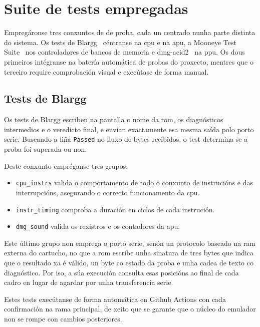 \section{Suite de tests empregadas}
\label{sec:suite_tests}

Empregáronse tres conxuntos de  de proba, cada un centrado nunha parte distinta do sistema.
Os tests de Blargg~\cite{blargg} céntranse na \acrshort{cpu} e na \acrshort{apu},
a Mooneye Test Suite~\cite{mooneyetestsuite} nos controladores de bancos de memoria
e dmg-acid2~\cite{dmgacid2} na \acrshort{ppu}.
Os dous primeiros intégranse na batería automática de probas do proxecto,
mentres que o terceiro require comprobación visual e execútase de forma manual.


\subsection{Tests de Blargg}

Os tests de Blargg escriben na pantalla o nome da \acrshort{rom}, os diagnósticos intermedios e o veredicto final,
e envían exactamente esa mesma saída polo porto serie. Buscando a liña \texttt{Passed} no fluxo de bytes recibidos, o test determina se a proba foi superada ou non.

Deste conxunto empréganse tres grupos:
\begin{itemize}
    \item \texttt{cpu\_instrs} valida o comportamento de todo o conxunto de instrucións e das interrupcións, asegurando o correcto funcionamento da \acrshort{cpu}.
    \item \texttt{instr\_timing} comproba a duración en ciclos de cada instrución.
    \item \texttt{dmg\_sound} valida os rexistros e os contadores da \acrshort{apu}.
\end{itemize}

Este último grupo non emprega o porto serie, senón un protocolo baseado na \acrshort{ram} externa do cartucho,
no que a \acrshort{rom} escribe unha sinatura de tres bytes que indica que o resultado xa é válido,
un byte co estado da proba e unha cadea de texto co diagnóstico.
Por iso, a súa execución consulta esas posicións ao final de cada cadro en lugar de agardar por unha transferencia serie.

Estes tests execútanse de forma automática en Github Actions con cada confirmación na rama principal,
de xeito que se garante que o núcleo do emulador non se rompe con cambios posteriores.


